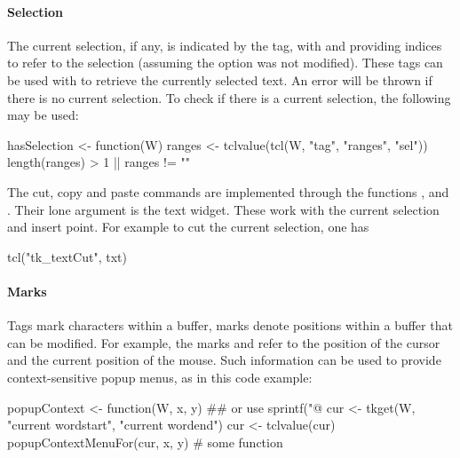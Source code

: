 \paragraph{Selection}
The current selection, if any, is indicated by the  tag,
with  and  providing indices to refer
to the selection (assuming the option  was not
modified). These tags can be used with  to retrieve the
currently selected text. An error will be thrown if there is no
current selection. To check if there is a current selection, the following may be used:
\begin{Schunk}
\begin{Sinput}
 hasSelection <- function(W) {
   ranges <- tclvalue(tcl(W, "tag", "ranges", "sel"))
   length(ranges) > 1 || ranges != ""
 }
\end{Sinput}
\end{Schunk}

The cut, copy and paste commands are implemented through the \Tk\/ functions
,  and
. Their lone argument is the text widget. These
work with the current selection and insert point. For example to cut
the current selection, one has
\begin{Schunk}
\begin{Sinput}
 tcl("tk_textCut", txt)
\end{Sinput}
\end{Schunk}

\paragraph{Marks}
Tags mark characters within a buffer, marks denote positions within a
buffer that can be modified. For example, the marks  and
 refer to the position of the cursor and the current
position of the mouse. Such information can be used to provide
context-sensitive popup menus, as in this code example:
\begin{Schunk}
\begin{Sinput}
 popupContext <- function(W, x, y) {
   ## or use sprintf("@%
   cur <- tkget(W, "current wordstart", "current wordend") 
   cur <- tclvalue(cur)
   popupContextMenuFor(cur, x, y)        # some function
 }
\end{Sinput}
\end{Schunk}


